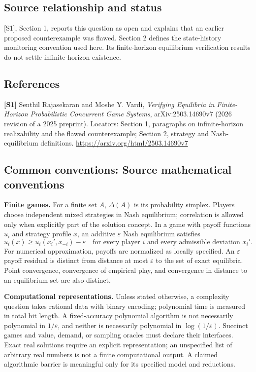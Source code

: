 \documentclass[11pt,a4paper]{article}
\begin{document}
\subsection*{Source relationship and status}
[S1], Section 1, reports this question as open and explains that an earlier proposed counterexample was flawed. Section 2 defines the state-history monitoring convention used here. Its finite-horizon equilibrium verification results do not settle infinite-horizon existence.
\subsection*{References}
\begingroup\footnotesize\raggedright
\textbf{[S1]} Senthil Rajasekaran and Moshe Y. Vardi, \emph{Verifying Equilibria in Finite-Horizon Probabilistic Concurrent Game Systems}, arXiv:2503.14690v7 (2026 revision of a 2025 preprint). Locators: Section 1, paragraphs on infinite-horizon realizability and the flawed counterexample; Section 2, strategy and Nash-equilibrium definitions. \url{https://arxiv.org/html/2503.14690v7}
\par\endgroup

\subsection*{Common conventions: Source mathematical conventions}

\textbf{Finite games.} For a finite set $A$, $\Delta(A)$ is its probability
simplex. Players choose independent mixed strategies in Nash equilibrium;
correlation is allowed only when explicitly part of the solution concept.
In a game with payoff functions $u_i$ and strategy profile $x$, an additive
$\varepsilon$ Nash equilibrium satisfies
\[
 u_i(x)\geq u_i(x_i',x_{-i})-\varepsilon
 \quad\text{for every player $i$ and every admissible deviation $x_i'$}.
\]
For numerical approximation, payoffs are normalized as locally specified.
An $\varepsilon$ payoff residual is distinct from distance at most
$\varepsilon$ to the set of exact equilibria. Point convergence, convergence
of empirical play, and convergence in distance to an equilibrium set are
also distinct.

\textbf{Computational representations.} Unless stated otherwise, a complexity
question takes rational data with binary encoding; polynomial time is measured
in total bit length. A fixed-accuracy polynomial algorithm is not necessarily
polynomial in $1/\varepsilon$, and neither is necessarily polynomial in
$\log(1/\varepsilon)$. Succinct games and value, demand, or sampling oracles
must declare their interfaces. Exact real solutions require an explicit
representation; an unspecified list of arbitrary real numbers is not a
finite computational output. A claimed algorithmic barrier is meaningful
only for its specified model and reductions.
\end{document}
